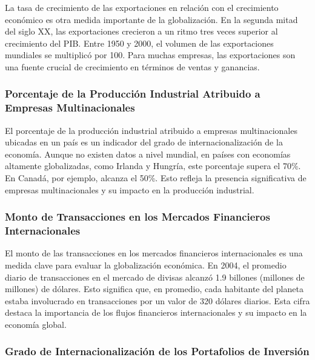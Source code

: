 \documentclass[
  letterpaper,
  DIV=11,
  numbers=noendperiod]{scrartcl}
\begin{document}
La tasa de crecimiento de las exportaciones en relación con el
crecimiento económico es otra medida importante de la globalización. En
la segunda mitad del siglo XX, las exportaciones crecieron a un ritmo
tres veces superior al crecimiento del PIB. Entre 1950 y 2000, el
volumen de las exportaciones mundiales se multiplicó por 100. Para
muchas empresas, las exportaciones son una fuente crucial de crecimiento
en términos de ventas y ganancias.

\hypertarget{porcentaje-de-la-producciuxf3n-industrial-atribuido-a-empresas-multinacionales}{%
\subsubsection{Porcentaje de la Producción Industrial Atribuido a
Empresas
Multinacionales}\label{porcentaje-de-la-producciuxf3n-industrial-atribuido-a-empresas-multinacionales}}

El porcentaje de la producción industrial atribuido a empresas
multinacionales ubicadas en un país es un indicador del grado de
internacionalización de la economía. Aunque no existen datos a nivel
mundial, en países con economías altamente globalizadas, como Irlanda y
Hungría, este porcentaje supera el 70\%. En Canadá, por ejemplo, alcanza
el 50\%. Esto refleja la presencia significativa de empresas
multinacionales y su impacto en la producción industrial.

\hypertarget{monto-de-transacciones-en-los-mercados-financieros-internacionales}{%
\subsubsection{Monto de Transacciones en los Mercados Financieros
Internacionales}\label{monto-de-transacciones-en-los-mercados-financieros-internacionales}}

El monto de las transacciones en los mercados financieros
internacionales es una medida clave para evaluar la globalización
económica. En 2004, el promedio diario de transacciones en el mercado de
divisas alcanzó 1.9 billones (millones de millones) de dólares. Esto
significa que, en promedio, cada habitante del planeta estaba
involucrado en transacciones por un valor de 320 dólares diarios. Esta
cifra destaca la importancia de los flujos financieros internacionales y
su impacto en la economía global.

\hypertarget{grado-de-internacionalizaciuxf3n-de-los-portafolios-de-inversiuxf3n}{%
\subsubsection{Grado de Internacionalización de los Portafolios de
Inversión}\label{grado-de-internacionalizaciuxf3n-de-los-portafolios-de-inversiuxf3n}}
\end{document}
